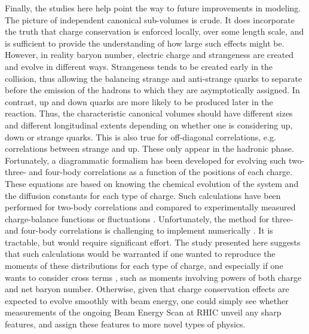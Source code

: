 Finally, the studies here help point the way to future improvements in modeling. The picture of independent canonical sub-volumes is crude. It does incorporate the truth that charge conservation is enforced locally, over some length scale, and is sufficient to provide the understanding of how large such effects might be. However, in reality baryon number, electric charge and strangeness are created and evolve in different ways. Strangeness tends to be created early in the collision, thus allowing the balancing strange and anti-strange quarks to separate before the emission of the hadrons to which they are asymptotically assigned. In contrast, up and down quarks are more likely to be produced later in the reaction. Thus, the characteristic canonical volumes should have different sizes and different longitudinal extents depending on whether one is considering up, down or strange quarks. This is also true for off-diagonal correlations, e.g. correlations between strange and up. These only appear in the hadronic phase. Fortunately, a diagrammatic formalism has been developed for evolving such two- three- and four-body correlations as a function of the positions of each charge. These equations are based on knowing the chemical evolution of the system and the diffusion constants for each type of charge. Such calculations have been performed for two-body correlations and compared to experimentally measured charge-balance functions \cite{Pratt:2018ebf,Pratt:2019pnd} or fluctuations \cite{Aziz:2004qu}. Unfortunately, the method for three- and four-body correlations  is challenging to implement numerically \cite{Pratt:2019fbj}. It is tractable, but would require significant effort. The study presented here suggests that such calculations would be warranted if one wanted to reproduce the moments of these distributions for each type of charge, and especially if one wants to consider cross terms \cite{Abdelwahab:2014yha}, such as moments involving powers of both charge and net baryon number. Otherwise, given that charge conservation effects are expected to evolve smoothly with beam energy, one could simply see whether measurements of the ongoing Beam Energy Scan at RHIC unveil any sharp features, and assign these features to more novel types of physics. 